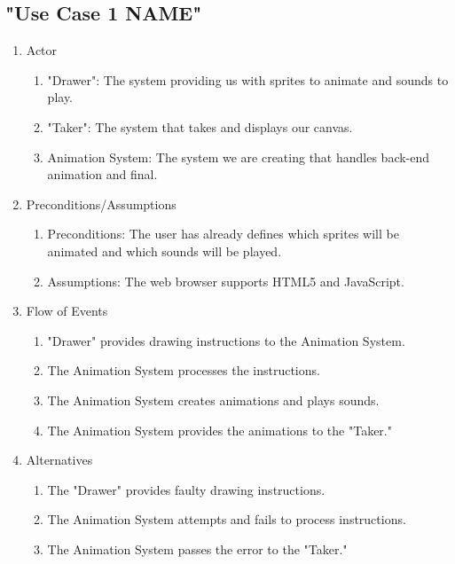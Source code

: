 \documentclass[12pt]{article}
\begin{document}
	\subsection{"Use Case 1 NAME"}
\begin{enumerate}
  \item Actor
  \begin{enumerate}
  		\item "Drawer": The system providing us with sprites to animate and sounds to play.
   		 \item "Taker": The system that takes and displays our canvas.
		\item Animation System: The system we are creating that handles back-end animation and final.
  \end{enumerate}
  \item Preconditions/Assumptions
  \begin{enumerate}
   		 \item Preconditions: The user has already defines which sprites will be animated and which sounds will be played.
   		 \item Assumptions: The web browser supports HTML5 and JavaScript.
  \end{enumerate}
  \item Flow of Events
  \begin{enumerate}
   		 \item "Drawer" provides drawing instructions to the Animation System. 
   		 \item The Animation System processes the instructions.
		\item The Animation System creates animations and plays sounds.
		\item The Animation System provides the animations to the "Taker."
  \end{enumerate}
  \item Alternatives
  \begin{enumerate}
    		\item The "Drawer" provides faulty drawing instructions.
    		\item The Animation System attempts and fails to process instructions.
		\item The Animation System passes the error to the "Taker."
  \end{enumerate}
\end{enumerate}
\end{document}
